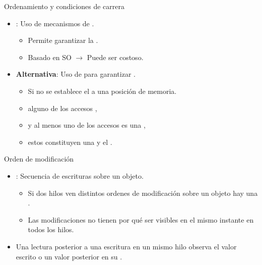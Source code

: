 \begin{frame}{Ordenamiento y condiciones de carrera}
\begin{itemize}
  \item {}: Uso de mecanismos de .
    \begin{itemize}
      \item Permite garantizar la .
      \item Basado en SO $\rightarrow$ Puede ser costoso.
    \end{itemize}

  \item \textbf{Alternativa}: Uso de  para garantizar 
        .
 
    \begin{itemize}
      \item Si no se establece el  a una posición de memoria.
      \item alguno de los accesos , 
      \item y al menos uno de los accesos es una , 
      \item estos constituyen una  y el 
        .
    \end{itemize}
\end{itemize}
\end{frame}

\begin{frame}{Orden de modificación}
\begin{itemize}
  \item {}: Secuencia de escrituras sobre un objeto.
    \begin{itemize}
      \item Si dos hilos ven distintos ordenes de modificación sobre un objeto hay una .
      \item Las modificaciones no tienen por qué ser visibles en el mismo instante en todos los hilos.
    \end{itemize}

  \item Una lectura posterior a una escritura en un mismo hilo observa 
        el valor escrito o un valor posterior en su .
\end{itemize}
\end{frame}

